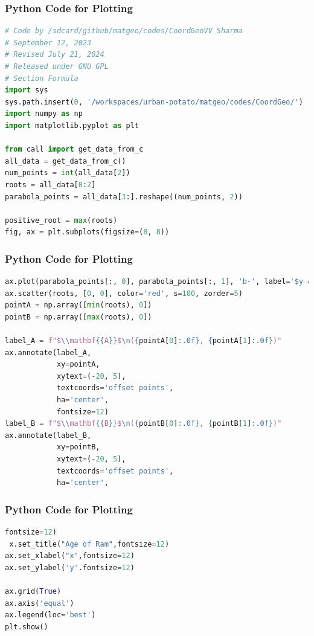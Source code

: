 \documentclass{beamer}
\theoremstyle{remark}
\numberwithin{equation}{section}
\begin{document}
\begin{frame}[fragile]
\frametitle{Python Code for Plotting}
\begin{lstlisting}[language=Python]
# Code by /sdcard/github/matgeo/codes/CoordGeoVV Sharma
# September 12, 2023
# Revised July 21, 2024
# Released under GNU GPL
# Section Formula
import sys
sys.path.insert(0, '/workspaces/urban-potato/matgeo/codes/CoordGeo/')
import numpy as np
import matplotlib.pyplot as plt

from call import get_data_from_c
all_data = get_data_from_c()
num_points = int(all_data[2])
roots = all_data[0:2]
parabola_points = all_data[3:].reshape((num_points, 2))

positive_root = max(roots)
fig, ax = plt.subplots(figsize=(8, 8))
\end{lstlisting}
\end{frame}
\begin{frame}[fragile]
\frametitle{Python Code for Plotting}
\begin{lstlisting}[language=Python]
ax.plot(parabola_points[:, 0], parabola_points[:, 1], 'b-', label='$y = x^2 - 4x - 21$')
ax.scatter(roots, [0, 0], color='red', s=100, zorder=5)
pointA = np.array([min(roots), 0])
pointB = np.array([max(roots), 0])

label_A = f"$\\mathbf{{A}}$\n({pointA[0]:.0f}, {pointA[1]:.0f})"
ax.annotate(label_A,
            xy=pointA,
            xytext=(-20, 5),
            textcoords='offset points',
            ha='center',
            fontsize=12)
label_B = f"$\\mathbf{{B}}$\n({pointB[0]:.0f}, {pointB[1]:.0f})"
ax.annotate(label_B,
            xy=pointB,
            xytext=(-20, 5),
            textcoords='offset points',
            ha='center',

\end{lstlisting}
\end{frame}
\begin{frame}[fragile]
\frametitle{Python Code for Plotting}
\begin{lstlisting}[language=Python]
 fontsize=12)
 x.set_title("Age of Ram",fontsize=12)
ax.set_xlabel("x",fontsize=12)
ax.set_ylabel('y'.fontsize=12)

ax.grid(True)
ax.axis('equal')
ax.legend(loc='best')
plt.show()
\end{lstlisting}
\end{frame}
\end{document}

